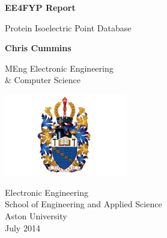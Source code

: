 %
%
%
\begin{titlepage}
  \begin{center}
    \vspace*{1cm}

    \Huge
    \textbf{EE4FYP Report}

    \vspace{0.5cm}
    \LARGE
    Protein Isoelectric Point Database

    \vspace{1.5cm}

    \textbf{Chris Cummins}

    \vfill

    MEng Electronic Engineering\\
    \& Computer Science

    \vspace{0.8cm}

    \includegraphics[width=0.4\textwidth]{assets/aston.jpeg}

    \Large
    Electronic Engineering\\
    School of Engineering and Applied Science\\
    Aston University\\
    July 2014

  \end{center}
\end{titlepage}
